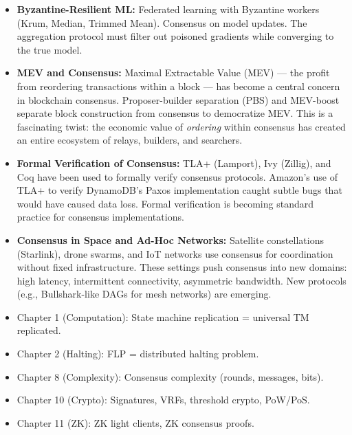 \begin{itemize}
\item \textbf{Byzantine-Resilient ML:} Federated learning with Byzantine workers (Krum, Median, Trimmed Mean). Consensus on model updates. The aggregation protocol must filter out poisoned gradients while converging to the true model.

\item \textbf{MEV and Consensus:} Maximal Extractable Value (MEV) — the profit from reordering transactions within a block — has become a central concern in blockchain consensus. Proposer-builder separation (PBS) and MEV-boost separate block construction from consensus to democratize MEV. This is a fascinating twist: the economic value of \emph{ordering} within consensus has created an entire ecosystem of relays, builders, and searchers.

\item \textbf{Formal Verification of Consensus:} TLA+ (Lamport), Ivy (Zillig), and Coq have been used to formally verify consensus protocols. Amazon's use of TLA+ to verify DynamoDB's Paxos implementation caught subtle bugs that would have caused data loss. Formal verification is becoming standard practice for consensus implementations.

\item \textbf{Consensus in Space and Ad-Hoc Networks:} Satellite constellations (Starlink), drone swarms, and IoT networks use consensus for coordination without fixed infrastructure. These settings push consensus into new domains: high latency, intermittent connectivity, asymmetric bandwidth. New protocols (e.g., Bullshark-like DAGs for mesh networks) are emerging.
\end{itemize}

\begin{itemize}
\item Chapter 1 (Computation): State machine replication = universal TM replicated.
\item Chapter 2 (Halting): FLP = distributed halting problem.
\item Chapter 8 (Complexity): Consensus complexity (rounds, messages, bits).
\item Chapter 10 (Crypto): Signatures, VRFs, threshold crypto, PoW/PoS.
\item Chapter 11 (ZK): ZK light clients, ZK consensus proofs.
\end{itemize}

